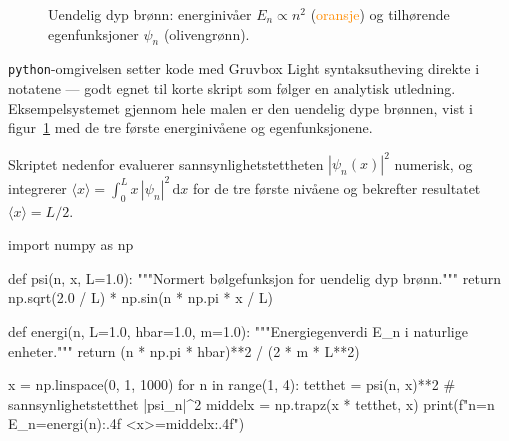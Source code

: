 \documentclass[a4paper,11pt]{article}
\begin{document}
\begin{figure}[H]
  \centering
  \caption{Uendelig dyp brønn: energinivåer $E_n \propto n^2$
           (\textcolor{darkorange}{oransje}) og tilhørende
           egenfunksjoner $\psi_n$ (\textcolor{darkolive}{olivengrønn}).}
  \label{fig:bronnn}
\end{figure}

\verb|python|-omgivelsen setter kode med Gruvbox Light
syntaksutheving direkte i notatene — godt egnet til korte skript
som følger en analytisk utledning. Eksempelsystemet gjennom hele
malen er den uendelig dype brønnen, vist i figur~\ref{fig:bronnn}
med de tre første energinivåene og egenfunksjonene.

Skriptet nedenfor evaluerer sannsynlighetstettheten
$|\psi_n(x)|^2$ numerisk, og integrerer
$\langle x \rangle = \int_0^L x\,|\psi_n|^2\,\mathrm{d}x$
for de tre første nivåene og bekrefter resultatet $\langle x \rangle = L/2$.

\begin{python}
import numpy as np

def psi(n, x, L=1.0):
    """Normert bølgefunksjon for uendelig dyp brønn."""
    return np.sqrt(2.0 / L) * np.sin(n * np.pi * x / L)

def energi(n, L=1.0, hbar=1.0, m=1.0):
    """Energiegenverdi E_n i naturlige enheter."""
    return (n * np.pi * hbar)**2 / (2 * m * L**2)

x = np.linspace(0, 1, 1000)
for n in range(1, 4):
    tetthet = psi(n, x)**2          # sannsynlighetstetthet |psi_n|^2
    middelx = np.trapz(x * tetthet, x)
    print(f"n={n}  E_n={energi(n):.4f}  <x>={middelx:.4f}")
\end{python}
\end{document}
